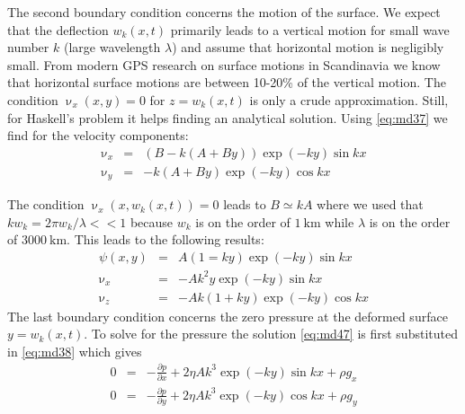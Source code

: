 The second boundary condition concerns the motion of the surface. We expect that the
deflection $w_k(x,t)$ primarily leads to a vertical motion for small wave number $k$
(large wavelength $\lambda$) and assume that horizontal motion is negligibly small. From modern
GPS research on surface motions in Scandinavia we know that horizontal surface motions
are between 10-20\% of the vertical motion. The condition $\upnu_x(x,y)=0$ for $z=w_k(x,t)$
is only a crude approximation. Still, for Haskell’s problem it helps finding an
analytical solution. Using \eqref{eq:md37} we find for the velocity components:
\begin{eqnarray}
\upnu_x &=& (B-k(A+By)) \exp (-ky) \sin kx \\
\upnu_y &=& -k(A+By) \exp (-ky) \cos kx
\label{eq:md46} 
\end{eqnarray}

\vspace{0.5cm}
\vspace{0.5cm}

The condition $\upnu_x(x,w_k(x,t))=0$ leads to $B\simeq kA$ where we used that
$k w_k = 2\pi w_k/\lambda <<1$ because $w_k$ is on the order of $1~\si{\km}$ 
while $\lambda$ is on the order of $3000~\si{\km}$.
This leads to the following results:
\begin{eqnarray}
\psi(x,y) &=& A(1=ky)\exp (-ky) \sin kx \\
\upnu_x &=& -A k^2 y \exp (-ky) \sin kx \\
\upnu_z &=& -Ak(1+ky) \exp(-ky) \cos kx \label{eq:md47}
\end{eqnarray}
The last boundary condition concerns the zero pressure at the deformed surface 
$y=w_k(x,t)$.
To solve for the pressure the solution \eqref{eq:md47} is first substituted in \eqref{eq:md38} 
which gives
\begin{eqnarray}
0 &=& -\frac{\partial p}{\partial x} + 2\eta A k^3 \exp (-ky) \sin kx + \rho g_x \\
0 &=& -\frac{\partial p}{\partial y} + 2\eta A k^3 \exp (-ky) \cos kx + \rho g_y 
\label{eq:md48}
\end{eqnarray}

\vspace{0.5cm}
\vspace{0.5cm}

